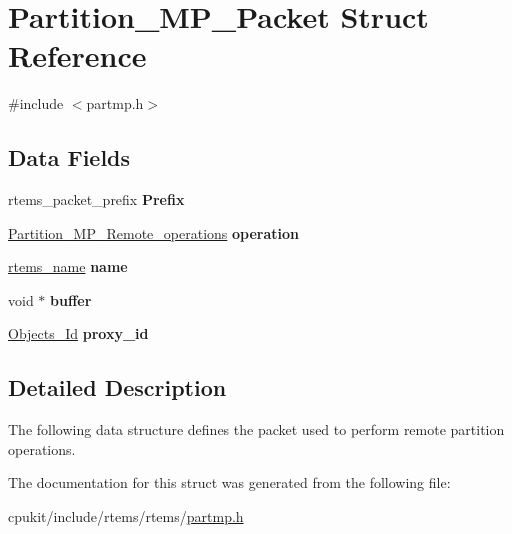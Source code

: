 \hypertarget{structPartition__MP__Packet}{}\section{Partition\+\_\+\+M\+P\+\_\+\+Packet Struct Reference}
\label{structPartition__MP__Packet}


{\ttfamily \#include $<$partmp.\+h$>$}

\subsection*{Data Fields}
\begin{DoxyCompactItemize}
\item 
\mbox{\label{structPartition__MP__Packet_a6c525eb25d3bf5cc770df98861ed1c64}} 
rtems\+\_\+packet\+\_\+prefix {\bfseries Prefix}
\item 
\mbox{\label{structPartition__MP__Packet_a30e289c3da37c1941fcb1982e6576937}} 
\mbox{\hyperlink{partmp_8h_a9e4c60bcabf9953269110dbea7b578ac}{Partition\+\_\+\+M\+P\+\_\+\+Remote\+\_\+operations}} {\bfseries operation}
\item 
\mbox{\label{structPartition__MP__Packet_a7b694f95a8ddb20e887a7b3762521f8a}} 
\mbox{\hyperlink{group__ClassicTasks_ga55fb63c49f68c0cbd9bee004da15b1fd}{rtems\+\_\+name}} {\bfseries name}
\item 
\mbox{\label{structPartition__MP__Packet_adc17ffd917363ddf8b71367381dad5d2}} 
void $\ast$ {\bfseries buffer}
\item 
\mbox{\label{structPartition__MP__Packet_ac7741721a3e522f513ccbe4fe483c4ce}} 
\mbox{\hyperlink{group__RTEMSScoreObject_ga5821f52a51072941bdd603e542d0863e}{Objects\+\_\+\+Id}} {\bfseries proxy\+\_\+id}
\end{DoxyCompactItemize}


\subsection{Detailed Description}
The following data structure defines the packet used to perform remote partition operations. 

The documentation for this struct was generated from the following file\+:\begin{DoxyCompactItemize}
\item 
cpukit/include/rtems/rtems/\mbox{\hyperlink{partmp_8h}{partmp.\+h}}\end{DoxyCompactItemize}
